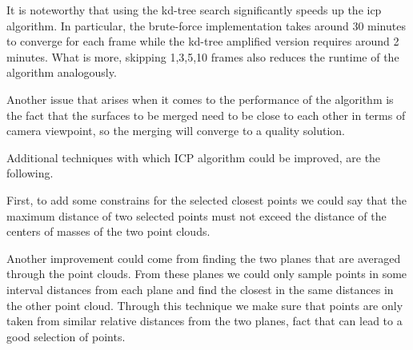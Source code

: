 It is noteworthy that using the kd-tree search significantly speeds up the icp algorithm. In particular, the brute-force implementation takes around 30 minutes to converge for each frame while the kd-tree amplified version requires around 2 minutes. What is more, skipping 1,3,5,10 frames also reduces the runtime of the algorithm analogously.

Another issue that arises when it comes to the performance of the algorithm is the fact that the surfaces to be merged need to be close to each other in terms of camera viewpoint, so the merging will converge to a quality solution.

Additional techniques with which ICP algorithm could be improved, are the following. 

First, to add some constrains for the selected closest points we could say that the maximum distance of two selected points must not exceed the distance of the centers of masses of the two point clouds. 

Another improvement could come from finding the two planes that are averaged through the point clouds. From these planes we could only sample points in some interval distances from each plane and find the closest in the same distances in the other point cloud. Through this technique we make sure that points are only taken from similar relative distances from the two planes, fact that can lead to a good selection of points.


